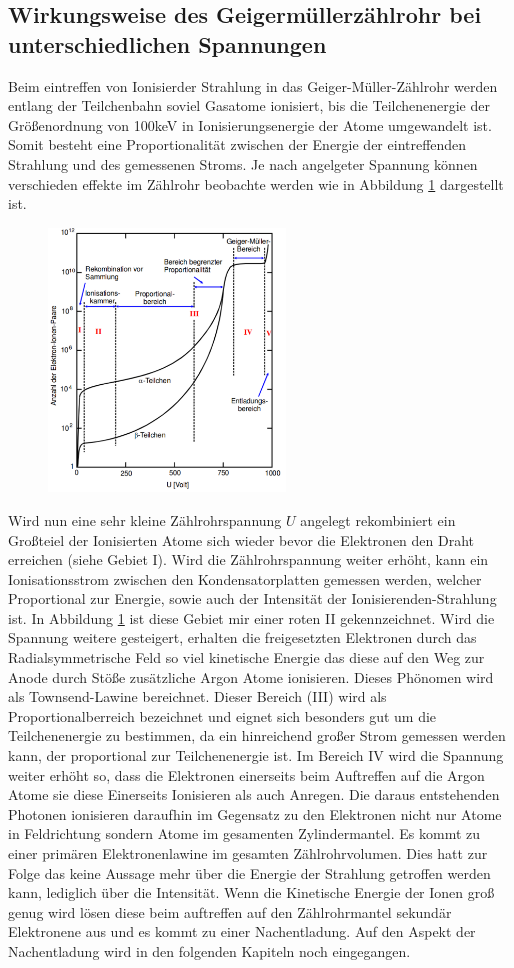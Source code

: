 \subsection{Wirkungsweise des Geigermüllerzählrohr bei unterschiedlichen Spannungen}
Beim eintreffen von Ionisierder Strahlung in das Geiger-Müller-Zählrohr werden entlang der Teilchenbahn soviel Gasatome ionisiert, bis die Teilchenenergie der Größenordnung von 100keV in Ionisierungsenergie der Atome umgewandelt ist. Somit besteht eine Proportionalität zwischen der Energie der eintreffenden Strahlung und des gemessenen Stroms. Je nach angelgeter Spannung können verschieden effekte im Zählrohr beobachte werden wie in Abbildung \ref{fig:Geb} dargestellt ist. 
\begin{figure}
  \centering
  \includegraphics[height=7cm]{picture/Gebiete.pdf}
  \caption{\cite{sample}}
  \label{fig:Geb}
\end{figure}
Wird nun eine sehr kleine Zählrohrspannung $U$ angelegt rekombiniert ein Großteiel der Ionisierten Atome sich wieder bevor die Elektronen den Draht erreichen (siehe Gebiet I). Wird die Zählrohrspannung weiter erhöht, kann ein Ionisationsstrom zwischen den Kondensatorplatten gemessen werden, welcher Proportional zur Energie, sowie auch der Intensität der Ionisierenden-Strahlung ist. In Abbildung \ref{fig:Geb} ist diese Gebiet mir einer roten II gekennzeichnet. Wird die Spannung weitere gesteigert, erhalten die freigesetzten Elektronen durch das Radialsymmetrische Feld so viel kinetische Energie das diese auf den Weg zur Anode durch Stöße zusätzliche Argon Atome ionisieren. Dieses Phönomen wird als Townsend-Lawine bereichnet. Dieser Bereich (III) wird als Proportionalberreich bezeichnet und eignet sich besonders gut um die Teilchenenergie zu bestimmen, da ein hinreichend großer Strom gemessen werden kann, der proportional zur Teilchenenergie ist. Im Bereich IV wird die Spannung weiter erhöht so, dass die Elektronen einerseits beim Auftreffen auf die Argon Atome sie diese Einerseits Ionisieren als auch Anregen. Die daraus entstehenden Photonen ionisieren daraufhin im Gegensatz zu den Elektronen nicht nur Atome in Feldrichtung sondern Atome im gesamenten Zylindermantel. Es kommt zu einer primären Elektronenlawine im gesamten Zählrohrvolumen. Dies hatt zur Folge das keine Aussage mehr über die Energie der Strahlung getroffen werden kann, lediglich über die Intensität. Wenn die Kinetische Energie der Ionen groß genug wird lösen diese beim auftreffen auf den Zählrohrmantel sekundär Elektronene aus und es kommt zu einer Nachentladung. Auf den Aspekt der Nachentladung wird in den folgenden Kapiteln noch eingegangen.

